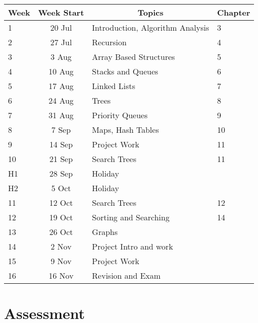 \documentclass{article}
\begin{document}
\renewcommand{\arraystretch}{1.5}
\begin{tabular}{|l|c|l|l|}
\hline
 Week & Week Start & \multicolumn{1}{c|}{Topics}               & Chapter   \\ \hline
 1    & 20 Jul     & Introduction, Algorithm Analysis          &   3 \\ \hline
 2    & 27 Jul     & Recursion                                 &   4 \\ \hline
 3    &  3 Aug     & Array Based Structures                    &   5 \\ \hline
 4    & 10 Aug     & Stacks and Queues                         &   6 \\ \hline
 5    & 17 Aug     & Linked Lists                              &   7 \\ \hline
 6    & 24 Aug     & Trees                                     &   8\\ \hline
 7    & 31 Aug     & Priority Queues                           &   9\\ \hline
 8    &  7 Sep     & Maps, Hash Tables                         &   10 \\ \hline
 9    & 14 Sep     & Project Work                              &   11 \\ \hline
 10   & 21 Sep     & Search Trees                              &   11 \\ \hline
 H1   & 28 Sep     & Holiday                                   &    \\ \hline
 H2   &  5 Oct     & Holiday                                   &    \\ \hline
 11   & 12 Oct     & Search Trees                              &   12 \\ \hline
 12   & 19 Oct     & Sorting and Searching                     &   14 \\ \hline
 13   & 26 Oct     & Graphs                                    &   \\ \hline
 14   &  2 Nov     & Project Intro and work                    &   \\ \hline
 15   &  9 Nov     & Project Work                              &   \\ \hline
 16   & 16 Nov     & Revision and Exam                         &   \\ \hline
\end{tabular}

\section*{Assessment}
\end{document}
